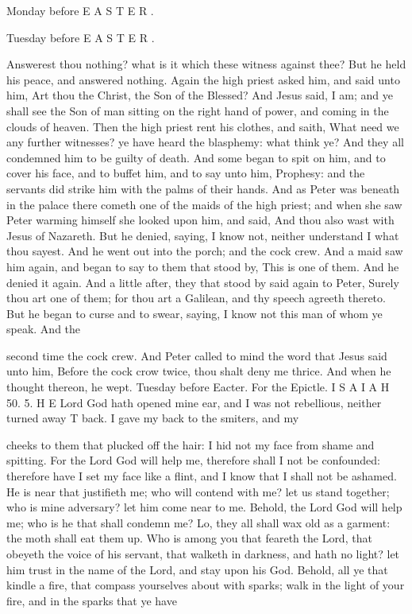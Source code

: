 Monday before E A S T E R .

Tuesday before E A S T E R .

Answerest thou nothing? what is it which these witness against thee? But he held his peace, and answered nothing. Again the high priest asked him, and said unto him, Art thou the Christ, the Son of the Blessed? And Jesus said, I am; and ye shall see the Son of man sitting on the right hand of power, and coming in the clouds of heaven. Then the high priest rent his clothes, and saith, What need we any further witnesses? ye have heard the blasphemy: what think ye? And they all condemned him to be guilty of death. And some began to spit on him, and to cover his face, and to buffet him, and to say unto him, Prophesy: and the servants did strike him with the palms of their hands. And as Peter was beneath in the palace there cometh one of the maids of the high priest; and when she saw Peter warming himself she looked upon him, and said, And thou also wast with Jesus of Nazareth. But he denied, saying, I know not, neither understand I what thou sayest. And he went out into the porch; and the cock crew. And a maid saw him again, and began to say to them that stood by, This is one of them. And he denied it again. And a little after, they that stood by said again to Peter, Surely thou art one of them; for thou art a Galilean, and thy speech agreeth thereto. But he began to curse and to swear, saying, I know not this man of whom ye speak. And the

second time the cock crew. And Peter called to mind the word that Jesus said unto him, Before the cock crow twice, thou shalt deny me thrice. And when he thought thereon, he wept. Tuesday before Eacter. For the Epictle. I S A I A H 50. 5. H E Lord God hath opened mine ear, and I was not rebellious, neither turned away T back. I gave my back to the smiters, and my

cheeks to them that plucked off the hair: I hid not my face from shame and spitting. For the Lord God will help me, therefore shall I not be confounded: therefore have I set my face like a flint, and I know that I shall not be ashamed. He is near that justifieth me; who will contend with me? let us stand together; who is mine adversary? let him come near to me. Behold, the Lord God will help me; who is he that shall condemn me? Lo, they all shall wax old as a garment: the moth shall eat them up. Who is among you that feareth the Lord, that obeyeth the voice of his servant, that walketh in darkness, and hath no light? let him trust in the name of the Lord, and stay upon his God. Behold, all ye that kindle a fire, that compass yourselves about with sparks; walk in the light of your fire, and in the sparks that ye have

